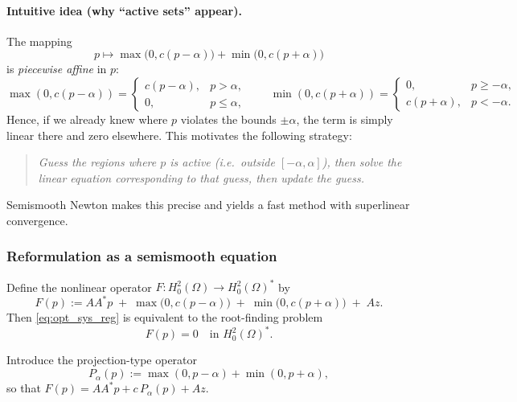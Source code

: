 \documentclass[11pt,a4paper]{article}
\begin{document}
\paragraph{Intuitive idea (why ``active sets'' appear).}
The mapping
\[
p \longmapsto \max\!\bigl(0,c(p-\alpha)\bigr)+\min\!\bigl(0,c(p+\alpha)\bigr)
\]
is \emph{piecewise affine} in $p$:
\[
\max(0,c(p-\alpha))=
\begin{cases}
c(p-\alpha), & p>\alpha,\\
0, & p\le \alpha,
\end{cases}
\qquad
\min(0,c(p+\alpha))=
\begin{cases}
0, & p\ge -\alpha,\\
c(p+\alpha), & p<- \alpha.
\end{cases}
\]
Hence, if we already knew where $p$ violates the bounds $\pm\alpha$, the term is simply linear there and zero elsewhere.
This motivates the following strategy:
\begin{quote}
\emph{Guess the regions where $p$ is active (i.e.\ outside $[-\alpha,\alpha]$), then solve the linear equation corresponding to that guess, then update the guess.}
\end{quote}
Semismooth Newton makes this precise and yields a fast method with superlinear convergence.

\subsubsection{Reformulation as a semismooth equation}

Define the nonlinear operator $F:H_0^2(\Omega)\to H_0^2(\Omega)^\ast$ by
\begin{equation}\label{eq:F_def_paper}
F(p):= AA^\ast p \;+\; \max\!\bigl(0,c(p-\alpha)\bigr)\;+\;\min\!\bigl(0,c(p+\alpha)\bigr)\;+\;Az.
\end{equation}
Then \eqref{eq:opt_sys_reg} is equivalent to the root-finding problem
\begin{equation}\label{eq:F_root}
F(p)=0 \quad \text{in } H_0^2(\Omega)^\ast.
\end{equation}

Introduce the projection-type operator
\begin{equation}\label{eq:Palpha}
P_\alpha(p):=\max(0,p-\alpha)+\min(0,p+\alpha),
\end{equation}
so that $F(p)=AA^\ast p + c\,P_\alpha(p)+Az$.
\end{document}
